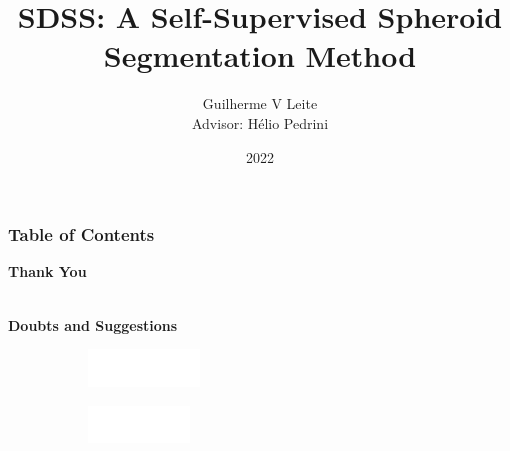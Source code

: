 \documentclass[aspectratio=169,t,xcolor=table]{beamer}
\begin{document}
\title[Inf UFG]{SDSS: A Self-Supervised Spheroid Segmentation
Method}

\author{Guilherme V Leite\\ \bigskip Advisor: Hélio Pedrini}

\date{2022}
\frame[noframenumbering]{\titlepage}



\begin{frame}
    \frametitle{Table of Contents}
    \tableofcontents
\end{frame}









\begin{frame}
    
    \centering
    \vspace{2cm}
    
    \textbf{\Huge Thank You}
    
    \ \\
    
    \textbf{Doubts and Suggestions}
    \ \\
    
    
    \vspace{2cm}
    \begin{figure}
        \centering
        \begin{subfigure}{0.2\textwidth}
            \centering
            \includegraphics[height=1cm]{lib/logos/infw.png}
        \end{subfigure}%
        \qquad 
        \begin{subfigure}{0.2\textwidth}
            \centering
            \includegraphics[height=1cm]{lib/logos/ufgw.png}
        \end{subfigure}
      
    \end{figure}
    
\end{frame}
\titlepage
\end{document}
